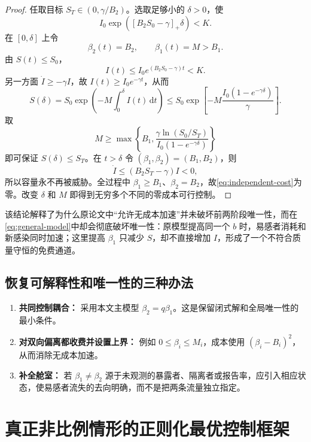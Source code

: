 \documentclass[11pt,a4paper,UTF8]{ctexart}
\theoremstyle{definition}
\newcommand{\pos}[1]{\left[#1\right]_{+}}
\newcommand{\dd}{\,\mathrm{d}}
\begin{document}
\begin{proof}
任取目标 $S_T\in(0,\gamma/B_2)$。选取足够小的 $\delta>0$，使
\begin{equation}
I_0\exp\left(\pos{B_2S_0-\gamma}\delta\right)<K.
\label{eq:delta-small}
\end{equation}
在 $[0,\delta]$ 上令
\begin{equation}
\beta_2(t)=B_2,
\qquad \beta_1(t)=M>B_1.
\label{eq:acceleration-pulse}
\end{equation}
由 $S(t)\le S_0$，
\[
I(t)\le I_0e^{(B_2S_0-\gamma)t}<K.
\]
另一方面 $\dot I\ge-\gamma I$，故 $I(t)\ge I_0e^{-\gamma t}$，从而
\[
S(\delta)
=S_0\exp\left(-M\int_0^\delta I(t)\dd t\right)
\le S_0\exp\left[-M\frac{I_0(1-e^{-\gamma\delta})}{\gamma}\right].
\]
取
\begin{equation}
M\ge
\max\left\{B_1,
\frac{\gamma\ln(S_0/S_T)}{I_0(1-e^{-\gamma\delta})}
\right\}
\label{eq:M-choice}
\end{equation}
即可保证 $S(\delta)\le S_T$。在 $t>\delta$ 令 $(\beta_1,\beta_2)=(B_1,B_2)$，则
\[
\dot I\le(B_2S_T-\gamma)I<0,
\]
所以容量永不再被威胁。全过程中 $\beta_1\ge B_1$、$\beta_2=B_2$，故\eqref{eq:independent-cost}为零。改变 $\delta$ 和 $M$ 即得到无穷多个不同的零成本可行控制。
\end{proof}

该结论解释了为什么原论文中“允许无成本加速”并未破坏前两阶段唯一性，而在\eqref{eq:general-model}中却会彻底破坏唯一性：原模型提高同一个 $b$ 时，易感者消耗和新感染同时加速；这里提高 $\beta_1$ 只减少 $S$，却不直接增加 $I$，形成了一个不符合质量守恒的免费通道。

\subsection{恢复可解释性和唯一性的三种办法}

\begin{enumerate}[label=\arabic*.,leftmargin=2.6em]
\item \textbf{共同控制耦合：} 采用本文主模型 $\beta_2=q\beta_1$。这是保留闭式解和全局唯一性的最小条件。
\item \textbf{对双向偏离都收费并设置上界：} 例如 $0\le\beta_i\le M_i$，成本使用 $(\beta_i-B_i)^2$，从而消除无成本加速。
\item \textbf{补全舱室：} 若 $\beta_1\ne\beta_2$ 源于未观测的暴露者、隔离者或报告率，应引入相应状态，使易感者流失的去向明确，而不是把两条流量独立指定。
\end{enumerate}

\section{真正非比例情形的正则化最优控制框架}
\end{document}
